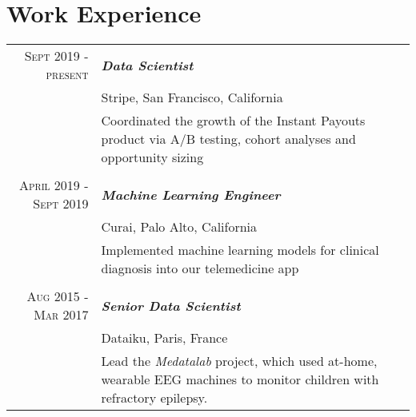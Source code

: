 \documentclass{article}
\begin{document}
\section{Work Experience}
\begin{tabular}{r | p{11cm}}

  \raggedleft \textsc{Sept} 2019 - \textsc{present} & \emph{\textbf{Data Scientist}} \\
   & Stripe, San Francisco, California\\
 &\footnotesize{Coordinated the growth of the Instant Payouts product via A/B testing, cohort analyses and opportunity sizing} \\
 
  \multicolumn{2}{c}{} \\
 
 \raggedleft \textsc{April} 2019 - \textsc{Sept} 2019 & \emph{\textbf{Machine Learning Engineer}} \\
   & Curai, Palo Alto, California\\
 &\footnotesize{Implemented machine learning models for clinical diagnosis into our telemedicine app} \\
 
  \multicolumn{2}{c}{} \\

 \raggedleft \textsc{Aug} 2015 - \textsc{Mar} 2017 & \emph{\textbf{Senior Data Scientist}} \\
   & Dataiku, Paris, France\\
 &\footnotesize{Lead the \emph{Medatalab} project, which used at-home, wearable EEG machines to monitor children with refractory epilepsy.} \\
 

\end{tabular}
\end{document}
